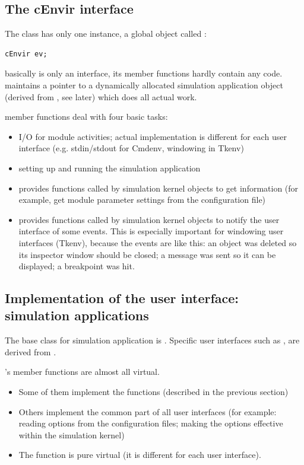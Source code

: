 \subsection{The cEnvir interface}

The  class has only one instance, a global object
called :

\begin{verbatim}
cEnvir ev;
\end{verbatim}

 basically is only an interface, its member functions
hardly contain any code.  maintains a pointer to a
dynamically allocated simulation application object (derived from
, see later) which does all actual work.


 member functions deal with four basic tasks:
\begin{itemize}
  \item{I/O for module activities; actual implementation is different
    for each user interface (e.g. stdin/stdout for Cmdenv, windowing
    in Tkenv)}
  \item{setting up and running the simulation application}
  \item{provides functions called by simulation kernel objects to get
    information (for example, get module parameter settings from the
    configuration file)}
  \item{provides functions called by simulation kernel objects to
    notify the user interface of some events. This is especially
    important for windowing user interfaces (Tkenv), because the
    events are like this: an object was deleted so its inspector
    window should be closed; a message was sent so it can be
    displayed; a breakpoint was hit.}
\end{itemize}




\subsection{Implementation of the user interface: simulation applications}

The base class for simulation application is .
Specific user interfaces such as ,
 are derived from .

's member functions are almost all virtual.
\begin{itemize}
  \item{Some of them implement the  functions
    (described in the previous section)}
  \item{Others implement the common part of all user interfaces (for
    example: reading options from the configuration files; making the
    options effective within the simulation kernel)}
  \item{The  function is pure virtual (it is different
    for each user interface).}
\end{itemize}

